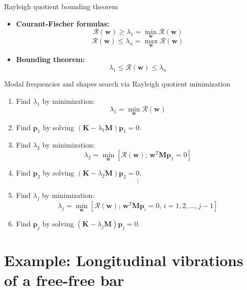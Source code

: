 \documentclass[aspectratio=169]{beamer}
\begin{document}
\begin{frame}{Rayleigh quotient bounding theorem}
  \begin{tcolorbox}[colback=darkred!10,colframe=darkred!40!black]
    \begin{itemize}
      \item \textbf{Courant-Fischer formulas:}
            \[
              \mathcal{R}(\mathbf{w}) \geq \lambda_1 = \min_{\mathbf{w}} \mathcal{R}(\mathbf{w}) \]
            \[
              \mathcal{R}(\mathbf{w}) \leq \lambda_n = \max_{\mathbf{w}} \mathcal{R}(\mathbf{w})
            \]
      \item \textbf{Bounding theorem:}
            \vspace{0.2cm}
            \[
              \lambda_1 \leq \mathcal{R}(\mathbf{w}) \leq \lambda_n
            \]
    \end{itemize}
  \end{tcolorbox}
\end{frame}

\begin{frame}{Modal frequencies and shapes search via Rayleigh quotient minimization}
  \begin{enumerate}
    \item[(1)] Find $\lambda_1$ by minimization: $$\lambda_1 = \min_{\mathbf{w}}
            \mathcal{R}(\mathbf{w})$$
    \item[(2)] Find $\mathbf p_1$ by solving $(\mathbf{K} - \lambda_1 \mathbf{M}) \mathbf{p}_1  = 0$.
          \vspace{0.3cm}
    \item[(3)] Find $\lambda_2$ by minimization: $$\lambda_2 = \min_{\mathbf{w}} [\mathcal{R}(\mathbf{w}); \, \mathbf{w}^T \mathbf{M} \mathbf{p}_1 = 0]$$
    \item[(4)] Find $\mathbf p_2$ by solving $(\mathbf{K} - \lambda_2 \mathbf{M}) \mathbf{p}_2  = 0$.
          \[
            \vdots
          \]
    \item[(j)]  Find $\lambda_j$ by minimization: $$\lambda_j = \min_{\mathbf{w}} [\mathcal{R}(\mathbf{w}); \, \mathbf{w}^T \mathbf{M} \mathbf{p}_i = 0, \, i = 1, 2, \dots, j-1]$$
    \item[(j+1)] Find $\mathbf p_j$ by solving $(\mathbf{K} - \lambda_j \mathbf{M}) \mathbf{p}_j  = 0$.
  \end{enumerate}
\end{frame}

\section{Example: Longitudinal vibrations of a free-free bar}
\end{document}
